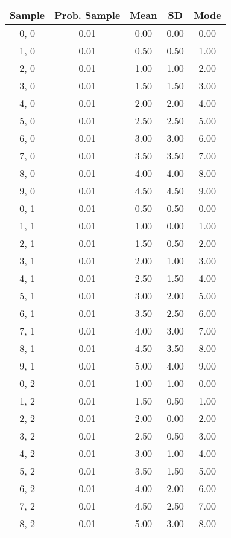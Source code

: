 \documentclass[12pt]{article}
\title{}
\author{}
\date{\today}
\begin{document}


\tiny
\begin{tabular}{c || c || c | c | c}
Sample & Prob. Sample & Mean & SD & Mode\\
\hline
0, 0 & 0.01 & 0.00 & 0.00 & 0.00 \\
1, 0 & 0.01 & 0.50 & 0.50 & 1.00 \\
2, 0 & 0.01 & 1.00 & 1.00 & 2.00 \\
3, 0 & 0.01 & 1.50 & 1.50 & 3.00 \\
4, 0 & 0.01 & 2.00 & 2.00 & 4.00 \\
5, 0 & 0.01 & 2.50 & 2.50 & 5.00 \\
6, 0 & 0.01 & 3.00 & 3.00 & 6.00 \\
7, 0 & 0.01 & 3.50 & 3.50 & 7.00 \\
8, 0 & 0.01 & 4.00 & 4.00 & 8.00 \\
9, 0 & 0.01 & 4.50 & 4.50 & 9.00 \\
0, 1 & 0.01 & 0.50 & 0.50 & 0.00 \\
1, 1 & 0.01 & 1.00 & 0.00 & 1.00 \\
2, 1 & 0.01 & 1.50 & 0.50 & 2.00 \\
3, 1 & 0.01 & 2.00 & 1.00 & 3.00 \\
4, 1 & 0.01 & 2.50 & 1.50 & 4.00 \\
5, 1 & 0.01 & 3.00 & 2.00 & 5.00 \\
6, 1 & 0.01 & 3.50 & 2.50 & 6.00 \\
7, 1 & 0.01 & 4.00 & 3.00 & 7.00 \\
8, 1 & 0.01 & 4.50 & 3.50 & 8.00 \\
9, 1 & 0.01 & 5.00 & 4.00 & 9.00 \\
0, 2 & 0.01 & 1.00 & 1.00 & 0.00 \\
1, 2 & 0.01 & 1.50 & 0.50 & 1.00 \\
2, 2 & 0.01 & 2.00 & 0.00 & 2.00 \\
3, 2 & 0.01 & 2.50 & 0.50 & 3.00 \\
4, 2 & 0.01 & 3.00 & 1.00 & 4.00 \\
5, 2 & 0.01 & 3.50 & 1.50 & 5.00 \\
6, 2 & 0.01 & 4.00 & 2.00 & 6.00 \\
7, 2 & 0.01 & 4.50 & 2.50 & 7.00 \\
8, 2 & 0.01 & 5.00 & 3.00 & 8.00 \\

\end{tabular}
\end{document}
